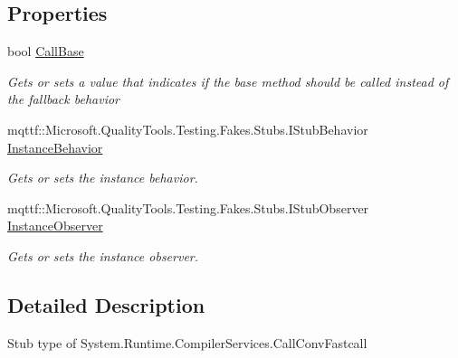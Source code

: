 \subsection*{Properties}
\begin{DoxyCompactItemize}
\item 
bool \hyperlink{class_system_1_1_runtime_1_1_compiler_services_1_1_fakes_1_1_stub_call_conv_fastcall_a32e0f1298dc3939230953e8e94b695c0}{Call\-Base}
\begin{DoxyCompactList}\small\item\em Gets or sets a value that indicates if the base method should be called instead of the fallback behavior\end{DoxyCompactList}\item 
mqttf\-::\-Microsoft.\-Quality\-Tools.\-Testing.\-Fakes.\-Stubs.\-I\-Stub\-Behavior \hyperlink{class_system_1_1_runtime_1_1_compiler_services_1_1_fakes_1_1_stub_call_conv_fastcall_a91644ee687591b4829f8e8c350fd3199}{Instance\-Behavior}
\begin{DoxyCompactList}\small\item\em Gets or sets the instance behavior.\end{DoxyCompactList}\item 
mqttf\-::\-Microsoft.\-Quality\-Tools.\-Testing.\-Fakes.\-Stubs.\-I\-Stub\-Observer \hyperlink{class_system_1_1_runtime_1_1_compiler_services_1_1_fakes_1_1_stub_call_conv_fastcall_a9a81da5b4daae5c60aad1a0a5b3b19cb}{Instance\-Observer}
\begin{DoxyCompactList}\small\item\em Gets or sets the instance observer.\end{DoxyCompactList}\end{DoxyCompactItemize}


\subsection{Detailed Description}
Stub type of System.\-Runtime.\-Compiler\-Services.\-Call\-Conv\-Fastcall



